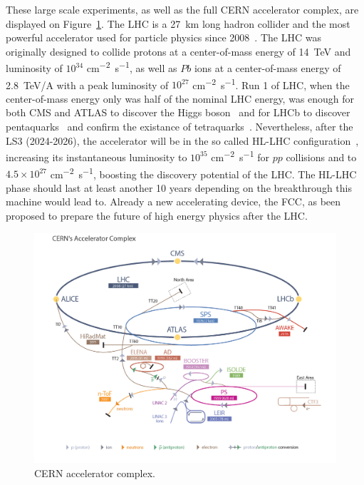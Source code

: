 	These large scale experiments, as well as the full CERN accelerator complex, are displayed on Figure~\ref{fig:CERNComplex}. The LHC is a \SI{27}{km} long hadron collider and the most powerful accelerator used for particle physics since 2008~\cite{LHC2008}. The LHC was originally designed to collide protons at a center-of-mass energy of \SI{14}{TeV} and luminosity of $10^{34}$ \si{cm^{-2}s^{-1}}, as well as $Pb$ ions at a center-of-mass energy of \SI{2.8}{TeV/A} with a peak luminosity of $10^{27}$ \si{cm^{-2}s^{-1}}. Run 1 of LHC, when the center-of-mass energy only was half of the nominal LHC energy, was enough for both CMS and ATLAS to discover the Higgs boson~\cite{HIGGS2015} and for LHCb to discover pentaquarks~\cite{PENTAQUARK2015} and confirm the existance of tetraquarks~\cite{TETRAQUARK2017}. Nevertheless, after the \acf{LS3} (2024-2026), the accelerator will be in the so called \acf{HL-LHC} configuration~\cite{HLLHC2017}, increasing its instantaneous luminosity to $10^{35}$ \si{cm^{-2}s^{-1}} for $pp$ collisions and to $4.5\times 10^{27}$ \si{cm^{-2}s^{-1}}, boosting the discovery potential of the LHC. The HL-LHC phase should last at least another 10 years depending on the breakthrough this machine would lead to. Already a new accelerating device, the FCC, as been proposed to prepare the future of high energy physics after the LHC.

	\begin{figure}[H]
		\centering
		\hspace*{-0.1\linewidth}
		\includegraphics[width=1.2\linewidth]{fig/chapt2/CERN_Accelerator_Complex.png}
		\caption{\label{fig:CERNComplex} CERN accelerator complex.}
	\end{figure}
	
